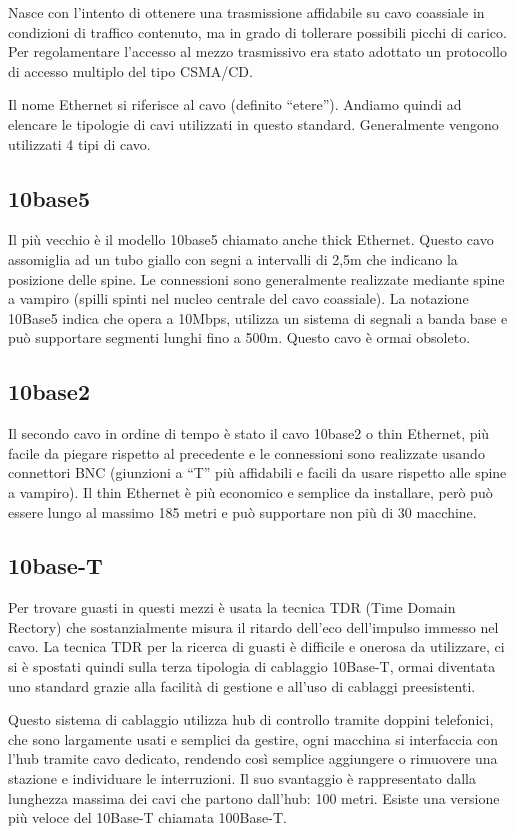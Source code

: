 Nasce con l’intento di ottenere una trasmissione affidabile su cavo coassiale in condizioni di traffico contenuto, ma in grado di tollerare possibili picchi di carico. Per regolamentare l’accesso al mezzo trasmissivo era stato adottato un protocollo di accesso multiplo del tipo CSMA/CD.

Il nome Ethernet si riferisce al cavo (definito “etere”). Andiamo quindi ad elencare le tipologie di cavi utilizzati in questo standard.
Generalmente vengono utilizzati 4 tipi di cavo.
\subsection{10base5}
Il più vecchio è il modello 10base5 chiamato anche thick Ethernet. Questo cavo assomiglia ad un tubo giallo con segni a intervalli di 2,5m che indicano la posizione delle spine.
Le connessioni sono generalmente realizzate mediante spine a vampiro (spilli spinti nel nucleo centrale del cavo coassiale). 
La notazione 10Base5 indica che opera a 10Mbps, utilizza un sistema di segnali a banda base e può supportare segmenti lunghi fino a 500m. Questo cavo è ormai obsoleto.
\subsection{10base2}
Il secondo cavo in ordine di tempo è stato il cavo 10base2 o thin Ethernet, più facile da piegare rispetto al precedente e le connessioni sono realizzate usando connettori BNC (giunzioni a “T” più affidabili e facili da usare rispetto alle spine a vampiro). Il thin Ethernet è più economico e semplice da installare, però può essere lungo al massimo 185 metri e può supportare non più di 30 macchine.
\subsection{10base-T}
Per trovare guasti in questi mezzi è usata la tecnica TDR (Time Domain Rectory) che sostanzialmente misura il ritardo dell'eco dell'impulso immesso nel cavo.
La tecnica TDR per la ricerca di guasti è difficile e onerosa da utilizzare, ci si è spostati quindi sulla terza tipologia di cablaggio 10Base-T, ormai diventata uno standard grazie alla facilità di gestione e all’uso di cablaggi preesistenti.

Questo sistema di cablaggio utilizza hub di controllo tramite doppini telefonici, che sono largamente usati e semplici da gestire, ogni macchina si interfaccia con l’hub tramite cavo dedicato, rendendo così semplice aggiungere o rimuovere una stazione e individuare le interruzioni. Il suo svantaggio è rappresentato dalla lunghezza massima dei cavi che partono dall’hub: 100 metri. Esiste una versione più veloce del 10Base-T chiamata 100Base-T.
